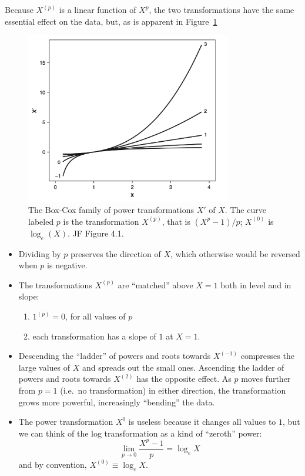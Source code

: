 Because $X^{(p)}$ is a linear function of $X^p$, the two transformations have the same essential effect on the data, but, as is apparent in Figure~\ref{fig:JF_4_1}
%
\begin{figure}[H]
\begin{center}
  \includegraphics[width=0.8\textwidth]{Lecture18/JF_4_1}
  \caption{The Box-Cox family of power transformations $X'$ of $X$.
  The curve labeled $p$ is the transformation $X^{(p)}$, that is $(X^p - 1)/p$; $X^{(0)}$ is $\log_e(X)$.
   JF Figure 4.1.}
  \label{fig:JF_4_1}
\end{center}
\end{figure}
%
\begin{itemize}
  \item Dividing by $p$ preserves the direction of $X$, which otherwise would be reversed when $p$ is negative.
  \item The transformations $X^{(p)}$ are ``matched'' above $X=1$ both in level and in slope:
    \begin{enumerate}
      \item $1^{(p)} = 0$, for all values of $p$
      \item each transformation has a slope of $1$ at $X=1$.
    \end{enumerate}
  \item Descending the ``ladder'' of powers and roots towards $X^{(-1)}$ compresses the large values of $X$ and spreads out the small ones.
  Ascending the ladder of powers and roots towards $X^{(2)}$ has the opposite effect.
  As $p$ moves further from $p=1$ (i.e.~no transformation) in either direction, the transformation grows more powerful, increasingly ``bending'' the data.
  \item The power transformation $X^0$ is useless because it changes all values to $1$, but we can think of the log transformation as a kind of ``zeroth'' power:
  $$
  \lim\limits_{p \to 0} \frac{X^p - 1}{p} = \log_e X
  $$
  and by convention, $X^{(0)} \equiv \log_e X$.
\end{itemize}


